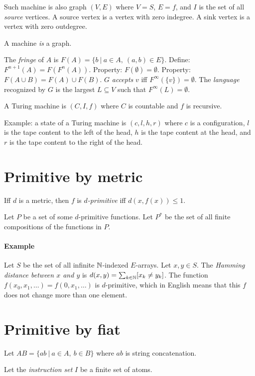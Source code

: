 Such machine is also graph \((V,E)\) where \(V=S\), \(E = f\),
and \(I\) is the set of all \emph{source} vertices.
A source vertex is a vertex with zero indegree.
A sink vertex is a vertex with zero outdegree.

A machine \emph{is} a graph.

The \emph{fringe} of \(A\) is \(F(A) = \{ b ~|~ a \in A, ~ (a,b) \in E \}\).
Define: \(F^{n+1}(A) = F(F^n(A))\).
Property: \(F(\emptyset) = \emptyset\).
Property: \(F(A \cup B) = F(A) \cup F(B)\).
\(G\) \emph{accepts} \(v\) iff \(F^\infty(\{v\}) = \emptyset\).
The \emph{language} recognized by \(G\) is the largest \(L \subseteq V\) such that \(F^\infty(L) = \emptyset\).

A Turing machine is \((C,I,f)\)
where \(C\) is countable
and \(f\) is recursive.

Example: a state of a Turing machine is \((c,l,h,r)\)
where \(c\) is a configuration,
\(l\) is the tape content to the left of the head,
\(h\) is the tape content at the head,
and \(r\) is the tape content to the right of the head.

\section{Primitive by metric}

Iff \(d\) is a metric,
then \(f\) is \emph{\(d\)-primitive} iff \(d(x,f(x)) \le 1\).

Let \(P\) be a set of some \(d\)-primitive functions.
Let \(P^*\) be the set of all finite compositions of the functions in \(P\).

\paragraph{Example}
Let \(S\) be the set of all infinite \(\mathbb{N}\)-indexed \(E\)-arrays.
Let \(x,y \in S\).
The \emph{Hamming distance between \(x\) and \(y\)} is
\(d(x,y) = \sum_{k\in\mathbb{N}} [x_k \neq y_k]\).
The function \(f(x_0,x_1,\ldots) = f(0,x_1,\ldots)\) is \(d\)-primitive,
which in English means that this \(f\) does not change more than one element.

\section{Primitive by fiat}

Let \(AB = \{ ab ~|~ a \in A, ~ b \in B \}\)
where \(ab\) is string concatenation.

Let the \emph{instruction set} \(I\) be a finite set of atoms.

